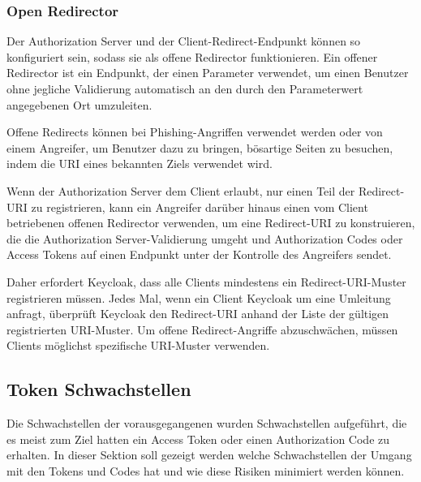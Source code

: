 \subsubsection{Open Redirector}

Der Authorization Server und der Client-Redirect-Endpunkt können so konfiguriert sein, sodass sie als offene Redirector funktionieren. Ein offener Redirector ist ein Endpunkt, der einen Parameter verwendet, um einen Benutzer ohne jegliche Validierung automatisch an den durch den Parameterwert angegebenen Ort umzuleiten. \cite{OAuthAuthorizationSecurityConsiderations}

Offene Redirects können bei Phishing-Angriffen verwendet werden oder von einem Angreifer, um Benutzer dazu zu bringen, bösartige Seiten zu besuchen, indem die URI eines bekannten Ziels verwendet wird. \cite{OAuthAuthorizationSecurityConsiderations}

Wenn der Authorization Server dem Client erlaubt, nur einen Teil der Redirect-URI zu registrieren, kann ein Angreifer darüber hinaus einen vom Client betriebenen offenen Redirector verwenden, um eine Redirect-URI zu konstruieren, die die Authorization Server-Validierung umgeht und Authorization Codes oder Access Tokens auf einen Endpunkt unter der Kontrolle des Angreifers sendet. \cite{OAuthAuthorizationSecurityConsiderations}

Daher erfordert Keycloak, dass alle Clients mindestens ein Redirect-URI-Muster registrieren müssen. Jedes Mal, wenn ein Client Keycloak um eine Umleitung anfragt, überprüft Keycloak den Redirect-URI anhand der Liste der gültigen registrierten URI-Muster. Um offene Redirect-Angriffe abzuschwächen, müssen Clients möglichst spezifische URI-Muster verwenden. \cite{keycloakDocs}

\subsection{Token Schwachstellen}

Die Schwachstellen der vorausgegangenen wurden Schwachstellen aufgeführt, die es meist zum Ziel hatten ein Access Token oder einen Authorization Code zu erhalten. In dieser Sektion soll gezeigt werden welche Schwachstellen der Umgang mit den Tokens und Codes hat und wie diese Risiken minimiert werden können. 


